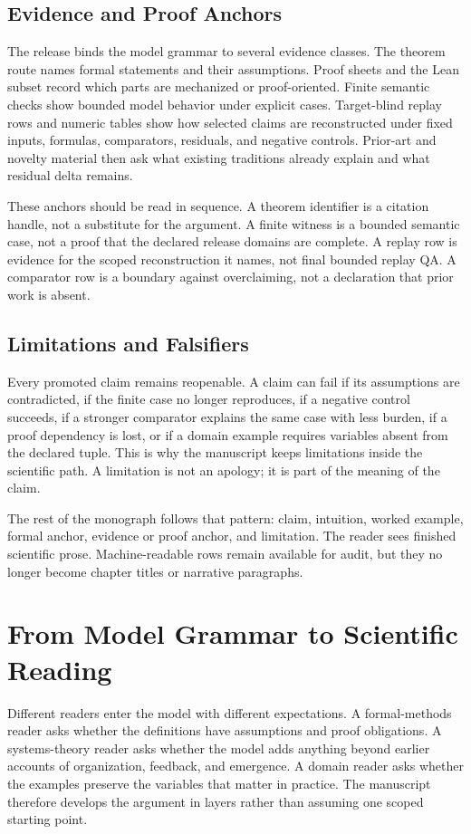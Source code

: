 \subsection{Evidence and Proof Anchors}
The release binds the model grammar to several evidence classes. The theorem route names formal statements and their assumptions. Proof sheets and the Lean subset record which parts are mechanized or proof-oriented. Finite semantic checks show bounded model behavior under explicit cases. Target-blind replay rows and numeric tables show how selected claims are reconstructed under fixed inputs, formulas, comparators, residuals, and negative controls. Prior-art and novelty material then ask what existing traditions already explain and what residual delta remains.

These anchors should be read in sequence. A theorem identifier is a citation handle, not a substitute for the argument. A finite witness is a bounded semantic case, not a proof that the declared release domains are complete. A replay row is evidence for the scoped reconstruction it names, not final bounded replay QA. A comparator row is a boundary against overclaiming, not a declaration that prior work is absent.

\subsection{Limitations and Falsifiers}
Every promoted claim remains reopenable. A claim can fail if its assumptions are contradicted, if the finite case no longer reproduces, if a negative control succeeds, if a stronger comparator explains the same case with less burden, if a proof dependency is lost, or if a domain example requires variables absent from the declared tuple. This is why the manuscript keeps limitations inside the scientific path. A limitation is not an apology; it is part of the meaning of the claim.

The rest of the monograph follows that pattern: claim, intuition, worked example, formal anchor, evidence or proof anchor, and limitation. The reader sees finished scientific prose. Machine-readable rows remain available for audit, but they no longer become chapter titles or narrative paragraphs.


\section{From Model Grammar to Scientific Reading}
\label{sec:oc133-reader-contract-scientific-route}
Different readers enter the model with different expectations. A formal-methods reader asks whether the definitions have assumptions and proof obligations. A systems-theory reader asks whether the model adds anything beyond earlier accounts of organization, feedback, and emergence. A domain reader asks whether the examples preserve the variables that matter in practice. The manuscript therefore develops the argument in layers rather than assuming one scoped starting point.

